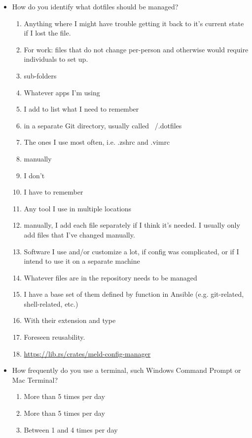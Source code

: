 \documentclass[letterpaper]{jdf}
\begin{document}
\begin{itemize}
\begin{enumerate}
    \end{enumerate}
    \item How do you identify what dotfiles should be managed?
    \begin{enumerate}
        \item Anything where I might have trouble getting it back to it's current state if I lost the file.
        \item For work: files that do not change per-person and otherwise would require individuals to set up.
        \item sub-folders
        \item Whatever apps I’m using
        \item I add to list what I need to remember
        \item in a separate Git directory, usually called ~/.dotfiles
        \item The ones I use most often, i.e. .zshrc and .vimrc
        \item manually
        \item I don't
        \item I have to remember
        \item Any tool I use in multiple locations
        \item manually, I add each file separately if I think it's needed. I usually only add files that I've changed manually.
        \item Software I use and/or customize a lot, if config was complicated, or if I intend to use it on a separate machine
        \item Whatever files are in the repository needs to be managed
        \item I have a base set of them defined by function in Ansible (e.g. git-related, shell-related, etc.)
        \item With their extension and type
        \item Foreseen reusability.
        \item \href{https://lib.rs/crates/meld-config-manager}{https://lib.rs/crates/meld-config-manager}
    \end{enumerate}
    \item How frequently do you use a terminal, such Windows Command Prompt or Mac Terminal?
    \begin{enumerate}
        \item More than 5 times per day
        \item More than 5 times per day
        \item Between 1 and 4 times per day

\end{enumerate}
\end{itemize}
\end{document}

